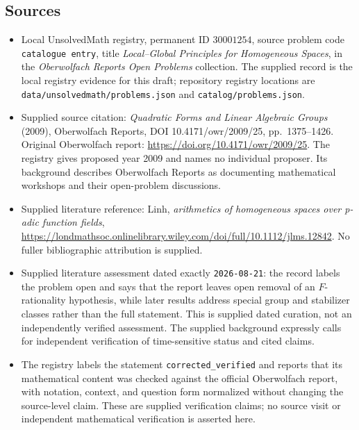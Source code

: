 \documentclass[11pt]{article}
\begin{document}
\subsection{Sources}
\begin{itemize}
\item Local UnsolvedMath registry, permanent ID \(30001254\), source problem code \texttt{catalogue entry}, title \emph{Local--Global Principles for Homogeneous Spaces}, in the \emph{Oberwolfach Reports Open Problems} collection. The supplied record is the local registry evidence for this draft; repository registry locations are \texttt{data/unsolvedmath/problems.json} and \texttt{catalog/problems.json}.
\item Supplied source citation: \emph{Quadratic Forms and Linear Algebraic Groups} (2009), Oberwolfach Reports, DOI 10.4171/owr/2009/25, pp.~1375--1426. Original Oberwolfach report: \url{https://doi.org/10.4171/owr/2009/25}. The registry gives proposed year 2009 and names no individual proposer. Its background describes Oberwolfach Reports as documenting mathematical workshops and their open-problem discussions.
\item Supplied literature reference: Linh, \emph{arithmetics of homogeneous spaces over p-adic function fields}, \url{https://londmathsoc.onlinelibrary.wiley.com/doi/full/10.1112/jlms.12842}. No fuller bibliographic attribution is supplied.
\item Supplied literature assessment dated exactly \texttt{2026-08-21}: the record labels the problem open and says that the report leaves open removal of an \(F\)-rationality hypothesis, while later results address special group and stabilizer classes rather than the full statement. This is supplied dated curation, not an independently verified assessment. The supplied background expressly calls for independent verification of time-sensitive status and cited claims.
\item The registry labels the statement \texttt{corrected\_verified} and reports that its mathematical content was checked against the official Oberwolfach report, with notation, context, and question form normalized without changing the source-level claim. These are supplied verification claims; no source visit or independent mathematical verification is asserted here.
\end{itemize}
\end{document}
